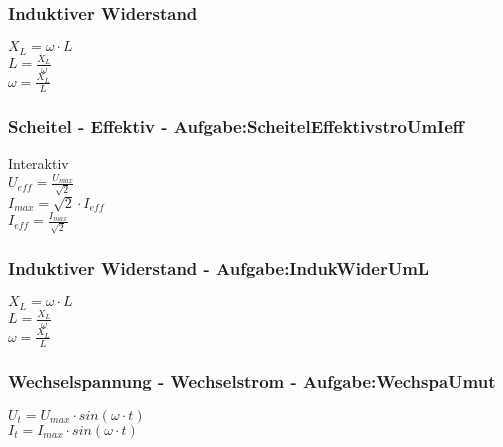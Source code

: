 \subsubsection{Induktiver Widerstand} 
\begin{minipage}{0.45\textwidth} 
$ X_{L} =\omega \cdot L $\\ 
$ L = \frac{X_{L} }{\omega } $\\ 
$ \omega =\frac{X_{L} }{L} $\\ 
\end{minipage} 
\begin{minipage}{0.45\textwidth} 
 
\end{minipage} 
\subsubsection{Scheitel - Effektiv  - Aufgabe:ScheitelEffektivstroUmIeff} 
\begin{minipage}{0.45\textwidth} 
Interaktiv\\ 
$ U_{eff}  = \frac{U_{max} }{\sqrt{2}} $\\ 
$ I_{max}  = \sqrt{2}\cdot I_{eff} $\\ 
$ I_{eff}  = \frac{I_{max} }{\sqrt{2}} $\\ 
\end{minipage} 
\begin{minipage}{0.45\textwidth} 
 
\end{minipage} 
\subsubsection{Induktiver Widerstand - Aufgabe:IndukWiderUmL} 
\begin{minipage}{0.45\textwidth} 
$ X_{L} =\omega \cdot L $\\ 
$ L = \frac{X_{L} }{\omega } $\\ 
$ \omega =\frac{X_{L} }{L} $\\ 
\end{minipage} 
\begin{minipage}{0.45\textwidth} 
 
\end{minipage} 
\subsubsection{Wechselspannung - Wechselstrom - Aufgabe:WechspaUmut} 
\begin{minipage}{0.45\textwidth} 
$ U_{t}  = U_{max} \cdot sin(\omega \cdot t) $\\ 
$ I_{t}  = I_{max} \cdot sin(\omega \cdot t) $\\ 
\end{minipage} 
\begin{minipage}{0.45\textwidth} 
 
\end{minipage} 

